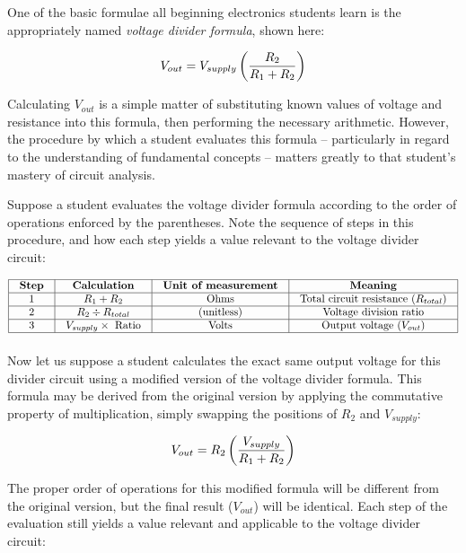 One of the basic formulae all beginning electronics students learn is the appropriately named \textit{voltage divider formula}, shown here:

$$V_{out} = V_{supply} \left( {R_2 \over R_1 + R_2} \right)$$

Calculating $V_{out}$ is a simple matter of substituting known values of voltage and resistance into this formula, then performing the necessary arithmetic.  However, the procedure by which a student evaluates this formula -- particularly in regard to the understanding of fundamental concepts -- matters greatly to that student's mastery of circuit analysis.

\filbreak

Suppose a student evaluates the voltage divider formula according to the order of operations enforced by the parentheses.  Note the sequence of steps in this procedure, and how each step yields a value relevant to the voltage divider circuit:


$$\vbox{\offinterlineskip
\halign{\strut
\vrule \quad\hfil # \ \hfil & 
\vrule \quad\hfil # \ \hfil & 
\vrule \quad\hfil # \ \hfil & 
\vrule \quad\hfil # \ \hfil \vrule \cr
\noalign{\hrule}
%
\textbf{Step} & \textbf{Calculation} & \textbf{Unit of measurement} & \textbf{Meaning} \cr
%
\noalign{\hrule}
%
1 & $R_1 + R_2$ & Ohms & Total circuit resistance ($R_{total}$) \cr
%
\noalign{\hrule}
%
2 & $R_2 \div R_{total}$ & (unitless) & Voltage division ratio \cr
%
\noalign{\hrule}
%
3 & $V_{supply} \times \hbox{ Ratio}$ & Volts & Output voltage ($V_{out}$) \cr
%
\noalign{\hrule}
} %
}$$ %

\vskip 10pt

Now let us suppose a student calculates the exact same output voltage for this divider circuit using a modified version of the voltage divider formula.  This formula may be derived from the original version by applying the commutative property of multiplication, simply swapping the positions of $R_2$ and $V_{supply}$:

$$V_{out} = R_2 \left( {V_{supply} \over R_1 + R_2} \right)$$

The proper order of operations for this modified formula will be different from the original version, but the final result ($V_{out}$) will be identical.  Each step of the evaluation still yields a value relevant and applicable to the voltage divider circuit:

